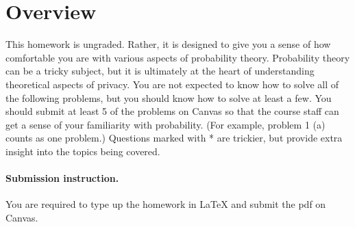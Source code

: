 \documentclass[14pt]{article}
\begin{document}


    \section*{Overview}

    This homework is ungraded. Rather, it is designed to give you a sense of how comfortable you are with various aspects of probability theory. Probability theory can be a tricky subject, but it is ultimately at the heart of understanding theoretical aspects of privacy. You are not expected to know how to solve all of the following problems, but you should know how to solve at least a few. You should submit at least 5 of the problems on Canvas so that the course staff can get a sense of your familiarity with probability. (For example, problem 1 (a) counts as one problem.) Questions marked with * are trickier, but provide extra insight into the topics being covered.

    \paragraph{Submission instruction.} You are required to type up the homework in LaTeX and submit the pdf on Canvas.


    
\end{document}
